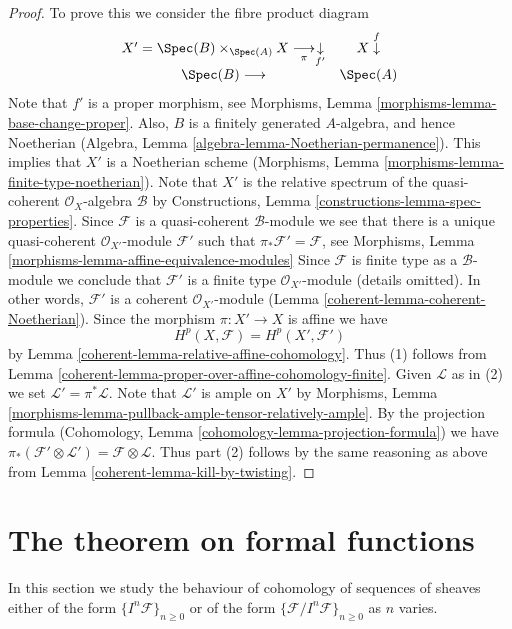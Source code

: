 \begin{proof}

To prove this we consider the fibre product diagram
$$
\begin{array}{cc}X' = \Spec(B) \times_{\Spec(A)} X
\underset{\pi}{\longrightarrow}\underset{f'}{\downarrow} & X \overset{f}{\downarrow} \\ \Spec(B) \longrightarrow & \Spec(A)\end{array}
$$
Note that $f'$ is a proper morphism, see
Morphisms, Lemma \ref{morphisms-lemma-base-change-proper}.
Also, $B$ is a finitely generated $A$-algebra, and hence
Noetherian (Algebra, Lemma \ref{algebra-lemma-Noetherian-permanence}).
This implies that $X'$ is a Noetherian scheme
(Morphisms, Lemma \ref{morphisms-lemma-finite-type-noetherian}).
Note that $X'$ is the relative spectrum of the quasi-coherent
$\mathcal{O}_X$-algebra $\mathcal{B}$ by
Constructions, Lemma \ref{constructions-lemma-spec-properties}.
Since $\mathcal{F}$ is a quasi-coherent $\mathcal{B}$-module
we see that there is a unique quasi-coherent
$\mathcal{O}_{X'}$-module $\mathcal{F}'$ such that
$\pi_*\mathcal{F}' = \mathcal{F}$, see
Morphisms, Lemma \ref{morphisms-lemma-affine-equivalence-modules}
Since $\mathcal{F}$ is finite type as a $\mathcal{B}$-module we
conclude that $\mathcal{F}'$ is a finite type
$\mathcal{O}_{X'}$-module (details omitted). In other words,
$\mathcal{F}'$ is a coherent $\mathcal{O}_{X'}$-module
(Lemma \ref{coherent-lemma-coherent-Noetherian}).
Since the morphism $\pi : X' \to X$ is affine we have
$$
H^p(X, \mathcal{F}) = H^p(X', \mathcal{F}')
$$
by Lemma \ref{coherent-lemma-relative-affine-cohomology}.
Thus (1) follows from
Lemma \ref{coherent-lemma-proper-over-affine-cohomology-finite}.
Given $\mathcal{L}$ as in (2) we set
$\mathcal{L}' = \pi^*\mathcal{L}$. Note that $\mathcal{L}'$ is
ample on $X'$ by
Morphisms, Lemma \ref{morphisms-lemma-pullback-ample-tensor-relatively-ample}.
By the projection formula
(Cohomology, Lemma \ref{cohomology-lemma-projection-formula}) we have
$\pi_*(\mathcal{F}' \otimes \mathcal{L}') = \mathcal{F} \otimes \mathcal{L}$.
Thus part (2) follows by the same reasoning as above from
Lemma \ref{coherent-lemma-kill-by-twisting}.
\end{proof}

\section{The theorem on formal functions}
\label{coherent-section-theorem-formal-functions}
In this section we study the behaviour of cohomology of
sequences of sheaves either of the form $\{I^n\mathcal{F}\}_{n \geq 0}$
or of the form $\{\mathcal{F}/I^n\mathcal{F}\}_{n \geq 0}$ as
$n$ varies.

